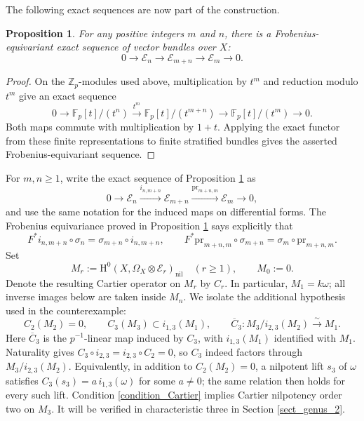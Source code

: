 \documentclass[12pt,a4]{amsart}
\newtheorem{prop}[claim]{Proposition}
\theoremstyle{definition}
\begin{document}
The following exact sequences are now part of the construction.
\begin{prop}\label{exact sequence of En}
For any positive integers $m$ and $n$, there is a Frobenius-equivariant
exact sequence of vector bundles over $X$:
\[
0 \longrightarrow \mathcal E_n \longrightarrow \mathcal E_{m+n}
\longrightarrow \mathcal E_m \longrightarrow 0.
\]
\end{prop}
\begin{proof}
On the $\mathbb Z_p$-modules used above, multiplication by $t^m$ and reduction
modulo $t^m$ give an exact sequence
\[
0\longrightarrow \mathbb F_p[t]/(t^n)
\xrightarrow{t^m}\mathbb F_p[t]/(t^{m+n})
\longrightarrow \mathbb F_p[t]/(t^m)\longrightarrow0.
\]
Both maps commute with multiplication by $1+t$.  Applying the exact functor
from these finite representations to finite stratified bundles gives the
asserted Frobenius-equivariant sequence.
\end{proof}






For $m,n\geq1$, write the exact sequence of Proposition
\ref{exact sequence of En} as
\[
0\longrightarrow\mathcal E_n
\xrightarrow{i_{n,m+n}}\mathcal E_{m+n}
\xrightarrow{\mathrm{pr}_{m+n,m}}\mathcal E_m
\longrightarrow0,
\]
and use the same notation for the induced maps on differential forms.
The Frobenius equivariance proved in Proposition
\ref{exact sequence of En} says explicitly that
\[
F^*i_{n,m+n}\circ\sigma_n
=\sigma_{m+n}\circ i_{n,m+n},\qquad
F^*\mathrm{pr}_{m+n,m}\circ\sigma_{m+n}
=\sigma_m\circ\mathrm{pr}_{m+n,m}.
\]
Set
\[
M_r:=\mathrm H^0(X,\Omega_X\otimes\mathcal E_r)_\mathrm{nil}
\quad(r\geq1),\qquad M_0:=0.
\]
Denote the resulting Cartier operator on $M_r$ by $C_r$.
In particular, $M_1=k\omega$; all inverse images below are taken inside $M_n$.
We isolate the additional hypothesis used in the counterexample:
\begin{equation*}\tag{C}\label{condition_Cartier}
C_2(M_2)=0,\qquad C_3(M_3)\subset i_{1,3}(M_1),\qquad
\overline C_3:M_3/i_{2,3}(M_2)\xrightarrow{\sim}M_1.
\end{equation*}
Here $\overline C_3$ is the $p^{-1}$-linear map induced by $C_3$, with
$i_{1,3}(M_1)$ identified with $M_1$. Naturality gives
$C_3\circ i_{2,3}=i_{2,3}\circ C_2=0$, so $C_3$ indeed factors through
$M_3/i_{2,3}(M_2)$. Equivalently, in addition to $C_2(M_2)=0$, a
nilpotent lift $s_3$ of $\omega$ satisfies
$C_3(s_3)=a\,i_{1,3}(\omega)$ for some $a\ne0$; the same relation then
holds for every such lift.
Condition \eqref{condition_Cartier} implies Cartier nilpotency order two
on $M_3$.
It will be verified in characteristic three in Section \ref{sect_genus_2}.
\end{document}
